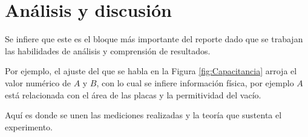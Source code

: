 \section{Análisis y discusión}
\label{sec:Analisis}

Se infiere que este es el bloque más importante del reporte dado que se trabajan las habilidades de análisis y comprensión de resultados.

Por ejemplo, el ajuste del que se habla en la Figura \ref{fig:Capacitancia} arroja el valor numérico de $ A $ y $ B $, con lo cual se infiere información física, por ejemplo $ A $ está relacionada con el área de las placas y la permitividad del vacío. 

Aquí es donde se unen las mediciones realizadas y la teoría que sustenta el experimento.